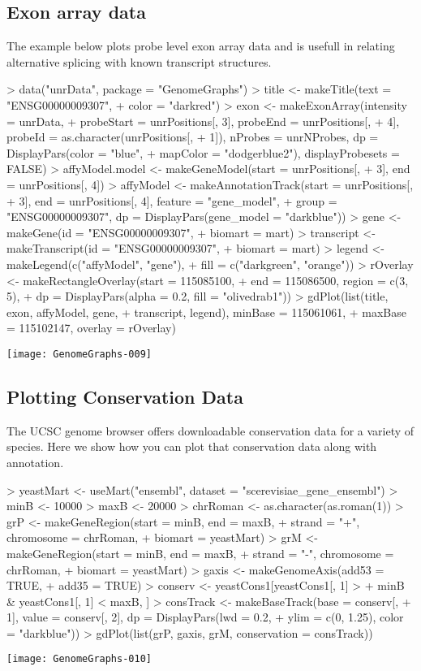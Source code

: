 \documentclass[11pt]{article}
\begin{document}
\subsection{Exon array data}

The example below plots probe level exon array data and is usefull in
relating alternative splicing with known transcript structures.

\begin{Schunk}
\begin{Sinput}
> data("unrData", package = "GenomeGraphs")
> title <- makeTitle(text = "ENSG00000009307", 
+     color = "darkred")
> exon <- makeExonArray(intensity = unrData, 
+     probeStart = unrPositions[, 3], probeEnd = unrPositions[, 
+         4], probeId = as.character(unrPositions[, 
+         1]), nProbes = unrNProbes, dp = DisplayPars(color = "blue", 
+         mapColor = "dodgerblue2"), displayProbesets = FALSE)
> affyModel.model <- makeGeneModel(start = unrPositions[, 
+     3], end = unrPositions[, 4])
> affyModel <- makeAnnotationTrack(start = unrPositions[, 
+     3], end = unrPositions[, 4], feature = "gene_model", 
+     group = "ENSG00000009307", dp = DisplayPars(gene_model = "darkblue"))
> gene <- makeGene(id = "ENSG00000009307", 
+     biomart = mart)
> transcript <- makeTranscript(id = "ENSG00000009307", 
+     biomart = mart)
> legend <- makeLegend(c("affyModel", "gene"), 
+     fill = c("darkgreen", "orange"))
> rOverlay <- makeRectangleOverlay(start = 115085100, 
+     end = 115086500, region = c(3, 5), 
+     dp = DisplayPars(alpha = 0.2, fill = "olivedrab1"))
> gdPlot(list(title, exon, affyModel, gene, 
+     transcript, legend), minBase = 115061061, 
+     maxBase = 115102147, overlay = rOverlay)
\end{Sinput}
\end{Schunk}
\texttt{[image: GenomeGraphs-009]}

\subsection{Plotting Conservation Data}
The UCSC genome browser offers downloadable conservation data for a
variety of species. Here we show how you can plot that conservation
data along with annotation. 

\begin{Schunk}
\begin{Sinput}
> yeastMart <- useMart("ensembl", dataset = "scerevisiae_gene_ensembl")
> minB <- 10000
> maxB <- 20000
> chrRoman <- as.character(as.roman(1))
> grP <- makeGeneRegion(start = minB, end = maxB, 
+     strand = "+", chromosome = chrRoman, 
+     biomart = yeastMart)
> grM <- makeGeneRegion(start = minB, end = maxB, 
+     strand = "-", chromosome = chrRoman, 
+     biomart = yeastMart)
> gaxis <- makeGenomeAxis(add53 = TRUE, 
+     add35 = TRUE)
> conserv <- yeastCons1[yeastCons1[, 1] > 
+     minB & yeastCons1[, 1] < maxB, ]
> consTrack <- makeBaseTrack(base = conserv[, 
+     1], value = conserv[, 2], dp = DisplayPars(lwd = 0.2, 
+     ylim = c(0, 1.25), color = "darkblue"))
> gdPlot(list(grP, gaxis, grM, conservation = consTrack))
\end{Sinput}
\end{Schunk}
\texttt{[image: GenomeGraphs-010]}
\end{document}
